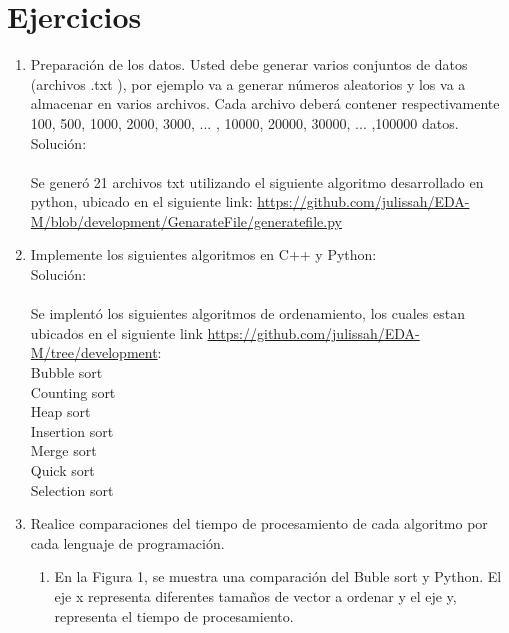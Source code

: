 \documentclass{article}
\begin{document}
	\section{Ejercicios}\label{sec:ejercicios}
	\begin{enumerate}
		\item Preparación de los datos. Usted debe generar varios conjuntos de datos (archivos .txt ), por
ejemplo va a generar números aleatorios y los va a almacenar en varios archivos. Cada archivo
deberá contener respectivamente 100, 500, 1000, 2000, 3000, ... , 10000, 20000, 30000, ... ,100000
datos.\\
		
		Solución: \\\\
		Se generó 21 archivos txt utilizando el siguiente algoritmo desarrollado en python, ubicado en el siguiente link: \url{https://github.com/julissah/EDA-M/blob/development/GenarateFile/generatefile.py}
		
		\item Implemente los siguientes algoritmos en C++ y Python:\\
		
		Solución:  \\\\
		Se implentó los siguientes algoritmos de ordenamiento, los cuales estan ubicados en el siguiente link \url{https://github.com/julissah/EDA-M/tree/development}:\\
		
		Bubble sort\\
        Counting sort\\
        Heap sort\\
        Insertion sort\\
        Merge sort\\
        Quick sort\\
        Selection sort\\
        
\item Realice comparaciones del tiempo de procesamiento de cada algoritmo por cada lenguaje de programación.
    \begin{enumerate}
        \item En la Figura 1, se muestra una comparación del Buble sort y Python. El eje x representa diferentes tamaños de vector a ordenar y el eje y, representa
            el tiempo de procesamiento.\\\\
    

\end{enumerate}
\end{enumerate}
\end{document}
